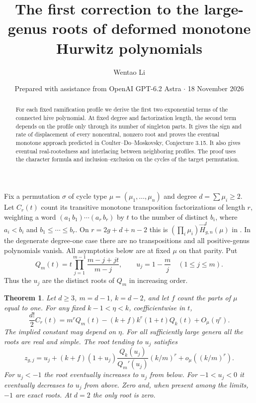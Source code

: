 \documentclass[11pt]{article}
\title{The first correction to the large-genus roots of deformed monotone Hurwitz polynomials}
\author{Wentao Li}
\date{Prepared with assistance from OpenAI GPT-6.2 Astra $\cdot$ 18 November 2026}
\newtheorem{theorem}{Theorem}
\newcommand{\HH}{\vec H}
\begin{document}
\maketitle
\begin{abstract}
For each fixed ramification profile we derive the first two exponential terms of the connected hive polynomial. At fixed degree and factorization length, the second term depends on the profile only through its number of singleton parts. It gives the sign and rate of displacement of every noncentral, nonzero root and proves the eventual monotone approach predicted in Coulter--Do--Moskovsky, Conjecture 3.15. It also gives eventual real-rootedness and interlacing between neighboring profiles. The proof uses the character formula and inclusion--exclusion on the cycles of the target permutation.
\end{abstract}

Fix a permutation $\sigma$ of cycle type $\mu=(\mu_1,\dots,\mu_n)$ and degree $d=\sum\mu_i\ge2$. Let $C_r(t)$ count its transitive monotone transposition factorizations of length $r$, weighting a word $(a_1\,b_1)\cdots(a_r\,b_r)$ by $t$ to the number of distinct $b_i$, where $a_i<b_i$ and $b_1\le\cdots\le b_r$. On $r=2g+d+n-2$ this is $(\prod_i\mu_i)\HH^t_{g,n}(\mu)$ in \cite[Def.~3.1]{cdm}. In the degenerate degree-one case there are no transpositions and all positive-genus polynomials vanish. All asymptotics below are at fixed $\mu$ on that parity. Put
\[
 Q_m(t)=t\prod_{j=1}^{m-1}\frac{m-j+jt}{m-j},
 \qquad u_j=1-\frac{m}{j}\quad(1\le j\le m).
\]
Thus the $u_j$ are the distinct roots of $Q_m$ in increasing order.

\begin{theorem}
Let $d\ge3$, $m=d-1$, $k=d-2$, and let $f$ count the parts of $\mu$ equal to one. For any fixed $k-1<\eta<k$, coefficientwise in $t$,
\begin{equation}\label{eq:main}
 \frac{d!}{2}C_r(t)=m^r Q_m(t)-(k+f)k^r(1+t)Q_k(t)+O_\mu(\eta^r).
\end{equation}
The implied constant may depend on $\eta$. For all sufficiently large genera all the roots are real and simple. The root tending to $u_j$ satisfies
\[
 z_{g,j}=u_j+
 (k+f)(1+u_j)\frac{Q_k(u_j)}{Q_m'(u_j)}
            (k/m)^r+o_\mu((k/m)^r).
\]
For $u_j<-1$ the root eventually increases to $u_j$ from below. For $-1<u_j<0$ it eventually decreases to $u_j$ from above. Zero and, when present among the limits, $-1$ are exact roots. At $d=2$ the only root is zero.
\end{theorem}
\end{document}
